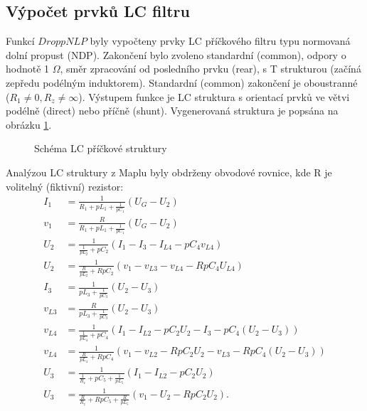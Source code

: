 \subsection{Výpočet prvků LC filtru}\label{s:VYP}
\noindent Funkcí $DroppNLP$ byly vypočteny prvky LC příčkového filtru typu normovaná dolní propust (NDP). Zakončení bylo zvoleno standardní (common), odpory o hodnotě 1 $\Omega$, směr zpracování od posledního prvku (rear), s T strukturou (začíná zepředu podélným induktorem). Standardní (common) zakončení je oboustranné ($R_1 \neq 0, R_z \neq \infty$). Výstupem funkce je LC struktura s orientací prvků ve větvi podélně (direct) nebo příčně (shunt).
Vygenerovaná struktura je popsána na obrázku \ref{s:SCHEM}.
\begin{figure}[h]
\centering
{}
\caption{Schéma LC příčkové struktury \label{s:SCHEM}}
\end{figure}
\noindent Analýzou LC struktury z Maplu byly obdrženy obvodové rovnice, kde R je volitelný (fiktivní) rezistor:
\begin{align}
I_1 &= \frac{1}{R_1 + pL_1 + \frac{1}{pC_1}}(U_G - U_2)\\
v_1 & = \frac{R}{R_1 + pL_1 + \frac{1}{pC_1}}(U_G - U_2)\\
U_2 &= \frac{1}{\frac{1}{pL_2} + pC_2}(I_1 - I_{3} - I_{L4} - pC_4 v_{L4})\\
U_2 &= \frac{1}{\frac{R}{pL_2} + RpC_2}(v_1 - v_{L3} - v_{L4} - RpC_4 U_{L4})\\
I_{3} &= \frac{1}{pL_3 + \frac{1}{pC_3}}(U_2 - U_3)\\
v_{L3} &= \frac{R}{pL_3 + \frac{1}{pC_3}}(U_2 - U_3)\\
v_{L4} &= \frac{1}{\frac{1}{pL_4}+pC_4}(I_1 - I_{L2} - pC_2U_2 - I_{3} - pC_4 (U_2 - U_3))\\
v_{L4} &= \frac{1}{\frac{R}{pL_4}+RpC_4}(v_1 - v_{L2} - RpC_2U_2 - v_{L3} - RpC_4 (U_2 - U_3))\\
U_3 &= \frac{1}{\frac{1}{R_z}+pC_5 + \frac{1}{pL_5}}(I_1 - I_{L2} - pC_2U_2)\\
U_3 &= \frac{1}{\frac{R}{R_z}+RpC_5 + \frac{R}{pL_5}}(v_1 - U_2 - RpC_2 U_2).
\end{align}
